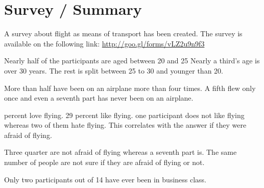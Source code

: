 \documentclass[a4paper]{article}
\begin{document}
\section*{Survey / Summary}
A survey about flight as means of transport has been created. The survey is 
available on the following link: \url{http://goo.gl/forms/vLZ2u9n9f3}

\noindent
Nearly half of the participants are aged between 20 and 25 Nearly a third's 
age is over 30 years. The rest is split between 25 to 30 and younger than 20. 

\noindent
More than half have been on an airplane more than four times. A fifth flew 
only once and even a seventh part has never been on an airplane. 

 percent love flying. 29 percent like flying. one participant does not like 
flying whereas two of them hate flying. This correlates with the answer if 
they were afraid of flying. 

\noindent
Three quarter are not afraid of flying whereas a seventh part is. The same 
number of people are not sure if they are afraid of flying or not. 

\noindent
Only two participants out of 14 have ever been in business class. 
\end{document}
